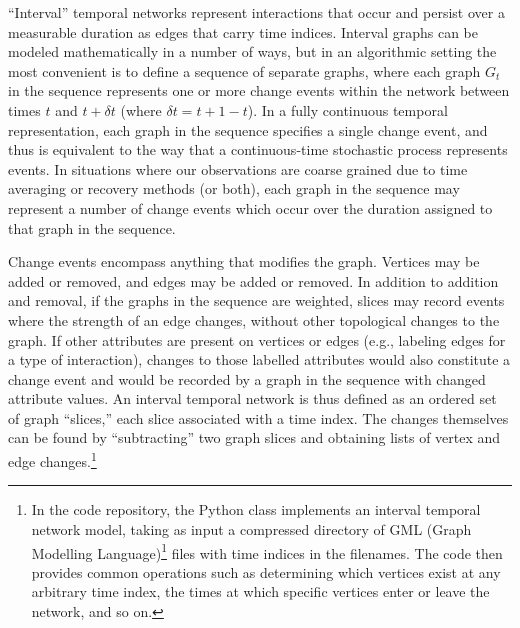 

``Interval'' temporal networks represent interactions that occur and persist over a measurable duration as edges that carry time indices.  Interval graphs can be modeled mathematically in a number of ways, but in an algorithmic setting the most convenient is to define a sequence of separate graphs, where each graph $G_t$ in the sequence represents one or more change events within the network between times $t$ and $t + \delta t$ (where $\delta t = t+1 - t$).  In a fully continuous temporal representation, each graph in the sequence specifies a single change event, and thus is equivalent to the way that a continuous-time stochastic process represents events.  In situations where our observations are coarse grained due to time averaging or recovery methods (or both), each graph in the sequence may represent a number of change events which occur over the duration assigned to that graph in the sequence.  


Change events encompass anything that modifies the graph.  Vertices may be added or removed, and edges may be added or removed. In addition to addition and removal, if the graphs in the sequence are weighted, slices may record events where the strength of an edge changes, without other topological changes to the graph.  If other attributes are present on vertices or edges (e.g., labeling edges for a type of interaction), changes to those labelled attributes would also constitute a change event and would be recorded by a graph in the sequence with changed attribute values.  An interval temporal network is thus defined as an ordered set of graph ``slices,'' each slice associated with a time index.  The changes themselves can be found by ``subtracting'' two graph slices and obtaining lists of vertex and edge changes.\footnote{In the \seriationct code repository, the Python class  implements an interval temporal network model, taking as input a compressed directory of GML (Graph Modelling Language)\footnote{GML is one of a number of file formats for storing graphs or networks in files.  GML is defined by a standards document located at \url{http://www.infosun.fim.uni-passau.de/Graphlet/GML/gml-tr.html} and is implemented widely by graph libraries and visualization tools.  Crucially, GML is highly extensible, allowing the text files to embed additional edge and vertex attributes which are useful for attaching metadata about the original community pattern and history through the entire experiment, so that it can be used after seriation to help evaluate the accuracy of the seriation results.} files with time indices in the filenames.  The code then provides common operations such as determining which vertices exist at any arbitrary time index, the times at which specific vertices enter or leave the network, and so on.}

